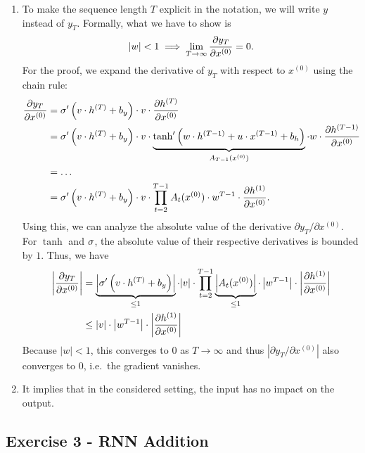 \documentclass[
  letterpaper,
  DIV=11,
  numbers=noendperiod]{scrartcl}
\begin{document}
\begin{enumerate}
\def\labelenumi{(\alph{enumi})}
\item
  To make the sequence length \(T\) explicit in the notation, we will
  write \(y\) instead of \(y_T\). Formally, what we have to show is \[
  |w|<1 \implies \lim_{T\to\infty} \frac{\partial y_T}{\partial x^{(0)}} = 0 .
  \] For the proof, we expand the derivative of \(y_T\) with respect to
  \(x^{(0)}\) using the chain rule: \[
  \begin{aligned}
  \frac{\partial y_T}{\partial x^{(0)}} 
    & = \sigma'\left(v \cdot h^{(T)} + b_y\right) 
      \cdot v \cdot \frac{\partial h^{(T)}}{\partial x^{(0)}} \\
    & = 
    \sigma'\left(v \cdot h^{(T)} + b_y\right) 
      \cdot v 
      \cdot 
        \underbrace{
          \tanh'\left(w \cdot h^{(T-1)} + u \cdot x^{(T-1)} + b_h\right)
        }_{A_{T-1}(x^{(0)})}
      \cdot w \cdot \frac{\partial h^{(T-1)}}{\partial x^{(0)}} \\
   & = \ldots \\
   & = \sigma'\left(v \cdot h^{(T)} + b_y\right) 
      \cdot v 
      \cdot \prod_{t=2}^{T-1} A_{t}(x^{(0)})
      \cdot w^{T-1} \cdot \frac{\partial h^{(1)}}{\partial x^{(0)}} .\\
  \end{aligned}
  \] Using this, we can analyze the absolute value of the derivative
  \(\partial y_T/\partial x^{(0)}\). For \(\tanh\) and \(\sigma\), the
  absolute value of their respective derivatives is bounded by \(1\).
  Thus, we have \[
  \begin{aligned}
  \left|\frac{\partial y_T}{\partial x^{(0)}} \right|
  & = 
  \underbrace{
    \left|\sigma'\left(v \cdot h^{(T)} + b_y\right) \right|
  }_{\leq 1}
  \cdot |v| 
  \cdot \prod_{t=2}^{T-1} 
    \underbrace{\left| A_{t}(x^{(0)}) \right|}_{\leq 1}
  \cdot \left|w^{T-1}\right| 
  \cdot \left|\frac{\partial h^{(1)}}{\partial x^{(0)}}\right| \\
  & \leq |v| 
  \cdot \left|w^{T-1}\right| 
  \cdot \left|\frac{\partial h^{(1)}}{\partial x^{(0)}}\right| \\
  \end{aligned}
  \] Because \(|w|<1\), this converges to \(0\) as \(T\to\infty\) and
  thus \(|\partial y_T/\partial x^{(0)}|\) also converges to \(0\),
  i.e.~the gradient vanishes.
\item
  It implies that in the considered setting, the input has no impact on
  the output.
\end{enumerate}

\subsection{Exercise 3 - RNN Addition}\label{exercise-3---rnn-addition}
\end{document}

